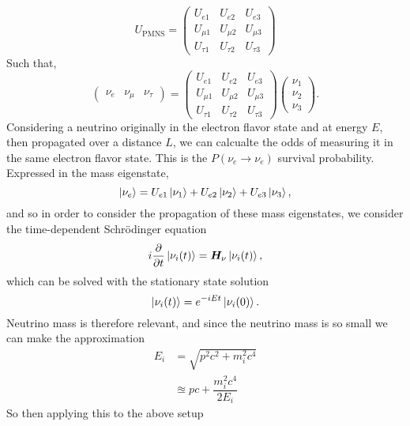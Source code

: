 \documentclass[main.tex]{subfiles}
\begin{document}
\begin{equation}
    U_{\text{PMNS}} = \left(\begin{array}{ccc} U_{e1} & U_{e2} & U_{e3} \\ U_{\mu 1} & U_{\mu 2} & U_{\mu 3} \\ U_{\tau 1} & U_{\tau 2} & U_{\tau 3} \end{array}\right)
\end{equation}
Such that, 
\begin{equation}
    \left(\begin{array}{ccc} \nu_{e} & \nu_{\mu} & \nu_{\tau} \end{array}\right)  = \left(\begin{array}{ccc} U_{e1} & U_{e2} & U_{e3} \\ U_{\mu 1} & U_{\mu 2} & U_{\mu 3} \\ U_{\tau 1} & U_{\tau 2} & U_{\tau 3} \end{array}\right) \left(\begin{array}{c} \nu_{1} \\ \nu_{2} \\ \nu_{3} \end{array}\right).
\end{equation}
Considering a neutrino originally in the electron flavor state and at energy $E$, then propagated over a distance \(L\), we can calcualte the odds of measuring it in the same electron flavor state. This is the $P(\nu_{e}\to\nu_{e})$ survival probability. Expressed in the mass eigenstate, 
\begin{equation}
    \left| \nu_{e} \right > = U_{e1} \left| \nu_{1} \right > + U_{e2} \left| \nu_{2} \right > + U_{e3}\left| \nu_{3} \right >,
\end{equation}
and so in order to consider the propagation of these mass eigenstates, we consider the time-dependent Schr\"odinger equation
\begin{equation}
i\dfrac{\partial}{\partial t} \left| \nu_{i} (t) \right > = \bm{H}_{\nu}\left| \nu_{i}(t) \right >,
\end{equation}
which can be solved with the stationary state solution 
\begin{equation}
    \left| \nu_{i} (t) \right >  =  e^{-iEt} \left| \nu_{i} (0) \right >.
\end{equation}
Neutrino mass is therefore relevant, and since the neutrino mass is so small we can make the approximation  
\begin{align}
E_{i} &= \sqrt{p^{2}c^{2} + m_{i}^{2}c^{4}} \\
&\approxeq pc + \dfrac{m_{i}^{2}c^{4}}{2E_{i}}
\end{align}
So then applying this to the above setup 
\end{document}
